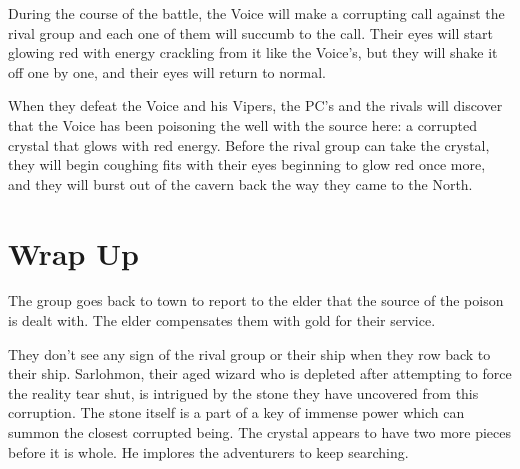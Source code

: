 \begin{multicols}{2}
  During the course of the battle, the Voice will make a corrupting call against the rival group and each one of them will succumb to the call. Their eyes will start glowing red with energy crackling from it like the Voice's, but they will shake it off one by one, and their eyes will return to normal.

  When they defeat the Voice and his Vipers, the PC's and the rivals will discover that the Voice has been poisoning the well with the source here: a corrupted crystal that glows with red energy. Before the rival group can take the crystal, they will begin coughing fits with their eyes beginning to glow red once more, and they will burst out of the cavern back the way they came to the North.

  \section{Wrap Up}
  The group goes back to town to report to the elder that the source of the poison is dealt with. The elder compensates them with gold for their service.

  They don't see any sign of the rival group or their ship when they row back to their ship. Sarlohmon, their aged wizard who is depleted after attempting to force the reality tear shut, is intrigued by the stone they have uncovered from this corruption. The stone itself is a part of a key of immense power which can summon the closest corrupted being. The crystal appears to have two more pieces before it is whole. He implores the adventurers to keep searching.

\end{multicols}